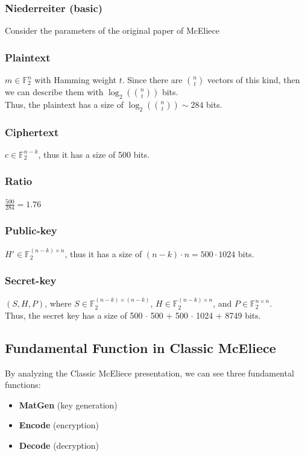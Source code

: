 \subsubsection{Niederreiter (basic)}
Consider the parameters of the original paper of McEliece

\subsubsection*{Plaintext}
$m \in \mathbb{F}_2^n$ with Hamming weight $t$. Since there are $\binom{n}{t}$ vectors of this kind, then we can describe them with $\log_2(\binom{n}{t})$ bits.\\
Thus, the plaintext has a size of $\log_2(\binom{n}{t}) \sim 284$ bits.

\subsubsection*{Ciphertext}
$c \in \mathbb{F}_2^{n-k}$, thus it has a size of 500 bits.

\subsubsection*{Ratio}
$\frac{500}{284} = 1.76$

\subsubsection*{Public-key}
$H' \in \mathbb{F}_2^{(n-k) \times n}$, thus it has a size of $(n-k) \cdot n = 500 \cdot 1024$ bits.

\subsubsection*{Secret-key}
$(S, H, P)$, where $S \in \mathbb{F}_2^{(n-k) \times (n-k)}$, $H \in \mathbb{F}_2^{(n-k) \times n}$, and $P \in \mathbb{F}_2^{n \times n}$.\\
Thus, the secret key has a size of 500 $\cdot$ 500 + 500 $\cdot$ 1024 + 8749 bits.  

\subsection{Fundamental Function in Classic McEliece}
By analyzing the Classic McEliece presentation, we can see  three fundamental functions:
\begin{itemize}
    \item \textbf{MatGen} (key generation)
    \item \textbf{Encode} (encryption)
    \item \textbf{Decode} (decryption)
\end{itemize}

